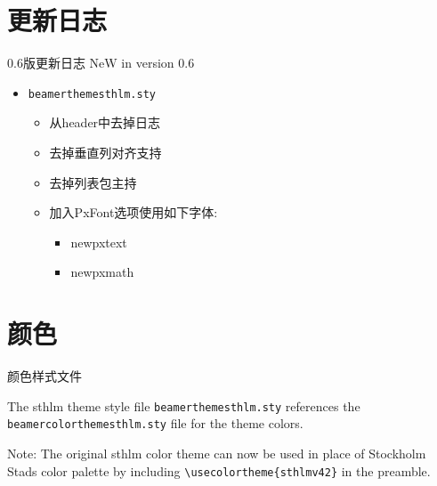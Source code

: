 \documentclass[newPxFont,sthlmFooter]{beamer}
\begin{document}
%
%

\section{更新日志}


\begin{frame}[c]{0.6版更新日志}
\alert{NeW} in version 0.6

\begin{itemize}
	\item \texttt{beamerthemesthlm.sty}
	\begin{itemize}
		\item 从header中去掉日志
		\item 去掉垂直列对齐支持
		\item 去掉列表包主持
		\item 加入PxFont选项使用如下字体:
		\begin{itemize}
			\item newpxtext
			\item newpxmath
		\end{itemize}
	\end{itemize}
\end{itemize}
\end{frame}


%
%
\section{颜色}


\begin{frame}[containsverbatim,c]{颜色样式文件}

The sthlm theme style file \texttt{beamerthemesthlm.sty} references the \texttt{beamercolorthemesthlm.sty} file for the theme colors.

\vspace{1em}

\begin{block}{Note:}
The original sthlm color theme can now be used in place of Stockholm Stads color palette by including \newline \lstinline!\usecolortheme{sthlmv42}! in the preamble.
\end{block}

\end{frame}
\end{document}

